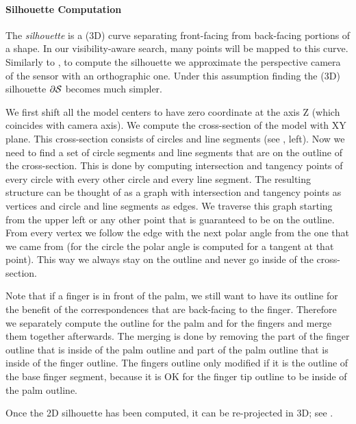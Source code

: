 
\paragraph{Silhouette Computation}
The \emph{silhouette} is a (3D) curve separating front-facing from back-facing portions of a shape.  In our visibility-aware search, many points will be mapped to this curve. Similarly to \cite{tagliasacchi2015robust}, to compute the silhouette we approximate the perspective camera of the sensor with an orthographic one. Under this assumption finding the (3D) silhouette $\partial \mathcal{S}$ becomes much simpler. 

We first shift all the model centers to have zero coordinate at the axis Z (which coincides with camera axis). We compute the cross-section of the model with XY plane. This cross-section consists of  circles and line segments (see , left). Now we need to find a set of circle segments and line segments that are on the outline of the cross-section. This is done by computing intersection and tangency points of every circle with every other circle and every line segment. The resulting structure can be thought of as a graph with intersection and tangency points as vertices and circle and line segments as edges. We traverse this graph starting from the upper left or any other point that is guaranteed to be on the outline. From every vertex we follow the edge with the next polar angle from the one that we came from (for the circle the polar angle is computed for a tangent at that point). This way  we always stay on the outline and never go inside of the cross-section.

Note that if a finger is in front of the palm, we still want to have its outline for the benefit of the correspondences that are back-facing to the finger.
Therefore we separately compute the outline for the palm and for the fingers and merge them together afterwards. The merging is done by removing the part of the finger outline that is inside of the palm outline and part of the palm outline that is inside of the finger outline. The fingers outline only modified if it is the outline of the base finger segment, because it is OK for the finger tip outline to be inside of the palm outline.

Once the 2D silhouette has been computed, it can be re-projected in 3D; see .


\FINISH
